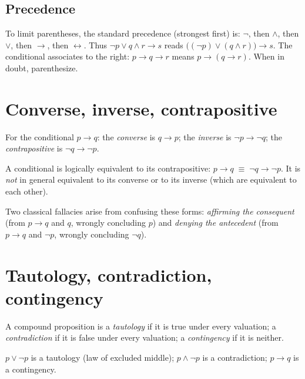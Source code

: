\subsection{Precedence}

To limit parentheses, the standard precedence (strongest first) is:
$\neg$, then $\wedge$, then $\vee$, then $\to$, then $\leftrightarrow$.
Thus $\neg p \vee q \wedge r \to s$ reads
$\bigl((\neg p) \vee (q \wedge r)\bigr) \to s$. The conditional associates to
the right: $p \to q \to r$ means $p \to (q \to r)$. When in doubt,
parenthesize.

\section{Converse, inverse, contrapositive}

\begin{definition}
For the conditional $p \to q$:
the \emph{converse} is $q \to p$;
the \emph{inverse} is $\neg p \to \neg q$;
the \emph{contrapositive} is $\neg q \to \neg p$.
\end{definition}

\begin{theorem}
A conditional is logically equivalent to its contrapositive:
$p \to q \;\equiv\; \neg q \to \neg p$. It is \emph{not} in general equivalent
to its converse or to its inverse (which are equivalent to each other).
\end{theorem}

Two classical fallacies arise from confusing these forms:
\emph{affirming the consequent} (from $p \to q$ and $q$, wrongly concluding
$p$) and \emph{denying the antecedent} (from $p \to q$ and $\neg p$, wrongly
concluding $\neg q$).

\section{Tautology, contradiction, contingency}

\begin{definition}
A compound proposition is a \emph{tautology} if it is true under every
valuation; a \emph{contradiction} if it is false under every valuation; a
\emph{contingency} if it is neither.
\end{definition}

\begin{example}
$p \vee \neg p$ is a tautology (law of excluded middle); $p \wedge \neg p$ is a
contradiction; $p \to q$ is a contingency.
\end{example}

